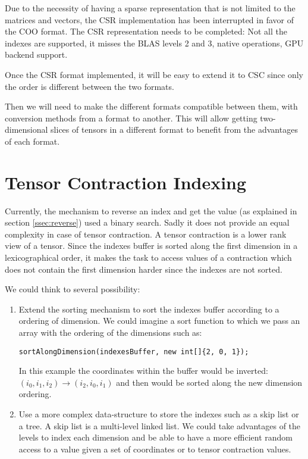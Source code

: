 Due to the necessity of having a sparse representation that is not limited to the matrices and vectors, the CSR implementation has been interrupted in favor of the COO format. The CSR representation needs to be completed: Not all the indexes are supported, it misses the BLAS levels 2 and 3, native operations, GPU backend support. 

Once the CSR format implemented, it will be easy to extend it to CSC since only the order is different between the two formats.

Then we will need to make the different formats compatible between them, with conversion methods from a format to another. This will allow getting two-dimensional slices of tensors in a different format to benefit from the advantages of each format.

\section{Tensor Contraction Indexing}

Currently, the mechanism to reverse an index and get the value (as explained in section \ref{ssec:reverse}) used a binary search. Sadly it does not provide an equal complexity in case of tensor contraction. A tensor contraction is a lower rank view of a tensor. Since the indexes buffer is sorted along the first dimension in a lexicographical order, it makes the task to access values of a contraction which does not contain the first dimension harder since the indexes are not sorted.

We could think to several possibility:
\begin{enumerate}
	\item Extend the sorting mechanism to sort the indexes buffer according to a ordering of dimension. We could imagine a sort function to which we pass an array with the ordering of the dimensions such as:
	\begin{lstlisting}[style=nonumbers]
		sortAlongDimension(indexesBuffer, new int[]{2, 0, 1});
	\end{lstlisting}
	In this example the coordinates within the buffer would be inverted:\\
	\qquad $(i_{0}, i_{1}, i_{2})  \rightarrow (i_{2}, i_{0}, i_{1})$  
	and then would be sorted along the new dimension ordering.
	\item Use a more complex data-structure to store the indexes such as a skip list or a tree. A skip list is a multi-level linked list. We could take advantages of the levels to index each dimension and be able to have a more efficient random access to a value given a set of coordinates or to tensor contraction values.
\end{enumerate} 

